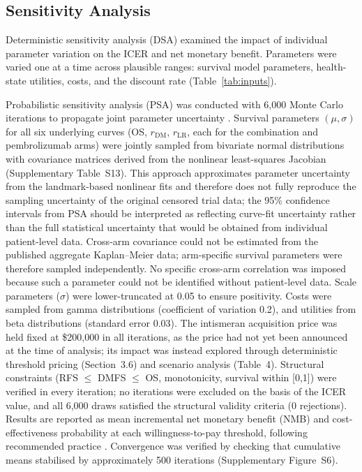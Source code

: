 \documentclass[12pt,a4paper]{article}
\begin{document}
\subsection{Sensitivity Analysis}

Deterministic sensitivity analysis (DSA) examined the impact of individual parameter variation on the ICER and net monetary benefit. Parameters were varied one at a time across plausible ranges: survival model parameters, health-state utilities, costs, and the discount rate (Table~\ref{tab:inputs}).

Probabilistic sensitivity analysis (PSA) was conducted with 6,000 Monte Carlo iterations to propagate joint parameter uncertainty \cite{briggs2006}. Survival parameters $(\mu, \sigma)$ for all six underlying curves (OS, $r_{\text{DM}}$, $r_{\text{LR}}$, each for the combination and \mbox{pembrolizumab} arms) were jointly sampled from bivariate normal distributions with covariance matrices derived from the nonlinear least-squares Jacobian (Supplementary Table~S13). This approach approximates parameter uncertainty from the landmark-based nonlinear fits and therefore does not fully reproduce the sampling uncertainty of the original censored trial data; the 95\% confidence intervals from PSA should be interpreted as reflecting curve-fit uncertainty rather than the full statistical uncertainty that would be obtained from individual patient-level data. Cross-arm covariance could not be estimated from the published aggregate Kaplan--Meier data; arm-specific survival parameters were therefore sampled independently. No specific cross-arm correlation was imposed because such a parameter could not be identified without patient-level data. Scale parameters ($\sigma$) were lower-truncated at 0.05 to ensure positivity. Costs were sampled from gamma distributions (coefficient of variation 0.2), and utilities from beta distributions (standard error 0.03). The intismeran acquisition price was held fixed at \$200,000 in all iterations, as the price had not yet been announced at the time of analysis; its impact was instead explored through deterministic threshold pricing (Section~3.6) and scenario analysis (Table~4). Structural constraints (RFS $\leq$ DMFS $\leq$ OS, monotonicity, survival within [0,1]) were verified in every iteration; no iterations were excluded on the basis of the ICER value, and all 6,000 draws satisfied the structural validity criteria (0 rejections). Results are reported as mean incremental net monetary benefit (NMB) and cost-effectiveness probability at each willingness-to-pay threshold, following recommended practice \cite{stinnett1998, fenwick2004}. Convergence was verified by checking that cumulative means stabilised by approximately 500 iterations (Supplementary Figure~S6).
\end{document}
